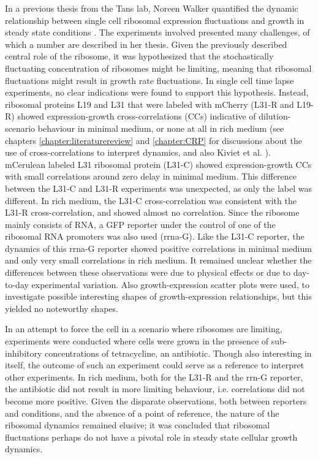 In a previous thesis from the Tans lab, Noreen Walker 
quantified the dynamic relationship between single cell ribosomal expression fluctuations and growth in steady state conditions \cite{Walker2016t}.
%
The experiments involved presented many challenges, 
of which a number are described in her thesis.
%
%
Given the previously described central role of the ribosome, 
it was hypothesized that the stochastically fluctuating concentration of ribosomes might be limiting, 
meaning that ribosomal fluctuations might result in growth rate fluctuations.
%
In single cell time lapse experiments, no clear indications were found to support this hypothesis.
%
Instead, 
ribosomal proteins L19 and L31 that were labeled with mCherry (L31-R and L19-R)
showed expression-growth cross-correlations (CCs) indicative of dilution-scenario behaviour in minimal medium, or none at all in rich medium (see chapters \ref{chapter:literaturereview} and \ref{chapter:CRP} for discussions about the use of cross-correlations to interpret dynamics, and also Kiviet et al. \cite{Kiviet2014}). 
mCerulean labeled L31 ribosomal protein (L31-C) showed expression-growth CCs with small correlations around zero delay 
in minimal medium.
This difference between the L31-C and L31-R experiments was unexpected, as only the label was different.
%
In rich medium, the L31-C cross-correlation was consistent with the L31-R cross-correlation, and showed almost no correlation.
%
Since the ribosome mainly consists of RNA, 
a GFP reporter under the control of one of the ribosomal RNA promoters was also used (rrna-G).
Like the L31-C reporter, the dynamics of this rrna-G reporter showed positive correlations in minimal medium and only very small correlations in rich medium.
%
It remained unclear whether the differences between these observations were due to physical effects 
or due to day-to-day experimental variation. 
%
Also growth-expression scatter plots were used, to investigate possible interesting shapes of growth-expression relationships, but this yielded no noteworthy shapes.

In an attempt to force the cell in a scenario where ribosomes are limiting, experiments were conducted where cells were grown in the presence of sub-inhibitory concentrations of tetracycline, an antibiotic.
%
Though also interesting in itself, the outcome of such an experiment could serve as a reference to interpret other experiments.
%
In rich medium, both for the L31-R and the rrn-G reporter, the antibiotic did not result in more limiting behaviour, i.e. correlations did not become more positive.
%
Given the disparate observations, both between reporters and conditions, 
and the absence of a point of reference,
the nature of the ribosomal dynamics remained elusive; it was concluded that ribosomal fluctuations perhaps do not have a pivotal role in steady state cellular growth dynamics.

